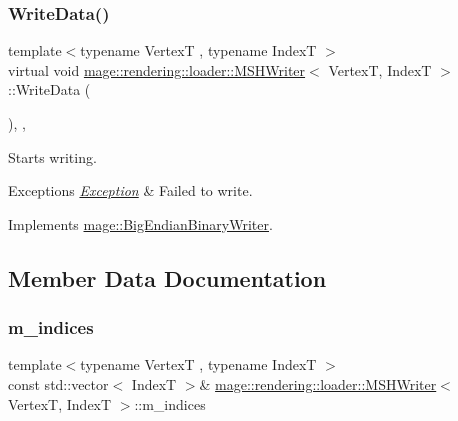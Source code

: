 \subsubsection{\texorpdfstring{Write\+Data()}{WriteData()}}
{\footnotesize\ttfamily template$<$typename VertexT , typename IndexT $>$ \\
virtual void \hyperlink{classmage_1_1rendering_1_1loader_1_1_m_s_h_writer}{mage\+::rendering\+::loader\+::\+M\+S\+H\+Writer}$<$ VertexT, IndexT $>$\+::Write\+Data (\begin{DoxyParamCaption}{ }\end{DoxyParamCaption})\hspace{0.3cm}{\ttfamily [override]}, {\ttfamily [private]}, {\ttfamily [virtual]}}

Starts writing.


\begin{DoxyExceptions}{Exceptions}
{\em \hyperlink{classmage_1_1_exception}{Exception}} & Failed to write. \\
\hline
\end{DoxyExceptions}


Implements \hyperlink{classmage_1_1_big_endian_binary_writer_a719581274b1b185ef05687183f7ded25}{mage\+::\+Big\+Endian\+Binary\+Writer}.



\subsection{Member Data Documentation}
\hypertarget{classmage_1_1rendering_1_1loader_1_1_m_s_h_writer_a7de7ca864e3a3a384bf7c98997146748}{}\label{classmage_1_1rendering_1_1loader_1_1_m_s_h_writer_a7de7ca864e3a3a384bf7c98997146748} 
\subsubsection{\texorpdfstring{m\+\_\+indices}{m\_indices}}
{\footnotesize\ttfamily template$<$typename VertexT , typename IndexT $>$ \\
const std\+::vector$<$ IndexT $>$\& \hyperlink{classmage_1_1rendering_1_1loader_1_1_m_s_h_writer}{mage\+::rendering\+::loader\+::\+M\+S\+H\+Writer}$<$ VertexT, IndexT $>$\+::m\+\_\+indices\hspace{0.3cm}{\ttfamily [private]}}

